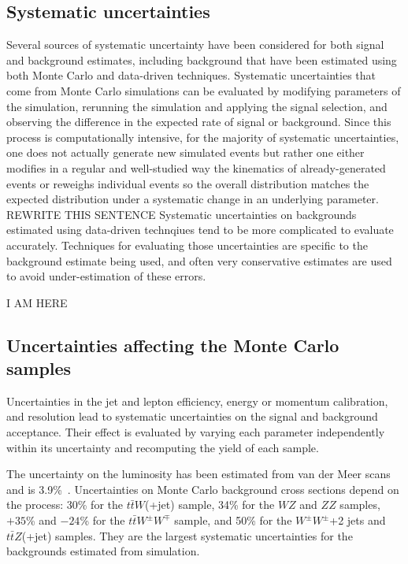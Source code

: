 
\subsection{Systematic uncertainties}\label{sect:syst}
Several sources of systematic uncertainty have been considered for both signal and background estimates, including background that have been estimated using both Monte Carlo and data-driven techniques.
Systematic uncertainties that come from Monte Carlo simulations can be evaluated by modifying parameters of the simulation, rerunning the simulation and applying the signal selection, and observing the difference in the expected rate of signal or background.
Since this process is computationally intensive, for the majority of systematic uncertainties, one does not actually generate new simulated events but rather one either modifies in a regular and well-studied way the kinematics of already-generated events or reweighs individual events so the overall distribution matches the expected distribution under a systematic change in an underlying parameter. REWRITE THIS SENTENCE
Systematic uncertainties on backgrounds estimated using data-driven technqiues tend to be more complicated to evaluate accurately.
Techniques for evaluating those uncertainties are specific to the background estimate being used, and often very conservative estimates are used to avoid under-estimation of these errors.


I AM HERE


\subsection{Uncertainties affecting the Monte Carlo samples}
Uncertainties in the jet and lepton efficiency, energy or momentum calibration, and resolution lead to systematic uncertainties on the signal and background acceptance. 
Their effect is evaluated by varying each parameter independently within its uncertainty and recomputing the yield of each sample.

The uncertainty on the luminosity has been estimated from van der Meer scans and is 3.9\%~\cite{Aad:2011dr,ATLAS-CONF-2011-116}. 
Uncertainties on Monte Carlo background cross sections depend on the process: 30\% for the $t\bar{t}W$(+jet) sample, 34\% for the $WZ$ and $ZZ$ samples, $+35$\% and $-24$\% for the $t\bar{t}W^{\pm}W^{\mp}$ sample, and 50\% for the $W^{\pm}W^{\pm}$+2 jets and $t\bar{t}Z$(+jet) samples. 
They are the largest systematic uncertainties for the backgrounds estimated from simulation.


